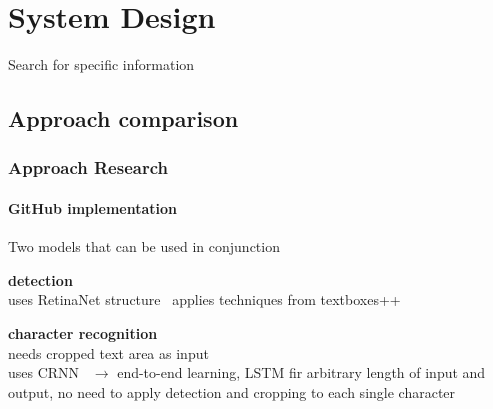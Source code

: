 \chapter{System Design}

Search for specific information

\section{Approach comparison}


\subsection{Approach Research}
\subsubsection*{GitHub implementation}
Two models that can be used in conjunction

\textbf{detection}~\cite{beom_text_2021}\\
uses RetinaNet structure~\cite{lin_focal_2018}
applies techniques from textboxes++~\cite{liao_textboxes_2018}

\textbf{character recognition}~\cite{beom_crnn_2021}\\
needs cropped text area as input\\
uses CRNN~\cite{shi_end--end_2015} $\rightarrow$ end-to-end learning, LSTM fir arbitrary length of
input and output, no need to apply detection and cropping to each single character

